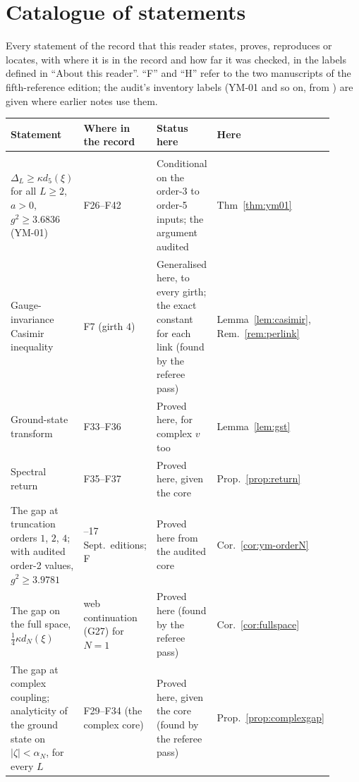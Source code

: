 \section{Catalogue of statements}\label{app:catalogue}

Every statement of the record that this reader states, proves, reproduces or locates, with where it is in the record and how far it was checked, in the labels defined in ``About this reader''. ``F'' and ``H'' refer to the two manuscripts of the fifth-reference edition; the audit's inventory labels (YM-01 and so on, from ) are given where earlier notes use them.

\begin{center}\small
\begin{longtable}{@{}>{\raggedright\arraybackslash}p{0.36\linewidth}>{\raggedright\arraybackslash}p{0.22\linewidth}>{\raggedright\arraybackslash}p{0.22\linewidth}>{\raggedright\arraybackslash}p{0.11\linewidth}@{}}
\toprule
Statement & Where in the record & Status here & Here\\
\midrule
\endhead
\multicolumn{4}{@{}l}{\emph{The strong-coupling gap (fifth reference)}}\\*
$\Delta_L\ge\kappa d_5(\xi)$ for all $L\ge2$, $a>0$, $g^2\ge3.6836$ (YM-01) & F26--F42 & Conditional on the order-3 to order-5 inputs; the argument audited & Thm~\ref{thm:ym01}\\
Gauge-invariance Casimir inequality & F7 (girth $4$) & Generalised here, to every girth; the exact constant for each link (found by the referee pass) & Lemma~\ref{lem:casimir}, Rem.~\ref{rem:perlink}\\
Ground-state transform & F33--F36 & Proved here, for complex $v$ too & Lemma~\ref{lem:gst}\\
Spectral return & F35--F37 & Proved here, given the core & Prop.~\ref{prop:return}\\
The gap at truncation orders $1$, $2$, $4$; with audited order-2 values, $g^2\ge3.9781$ & 14--17 Sept.\ editions; F & Proved here from the audited core & Cor.~\ref{cor:ym-orderN}\\
The gap on the full space, $\frac14\kappa d_N(\xi)$ & web continuation (G27) for $N=1$ & Proved here (found by the referee pass) & Cor.~\ref{cor:fullspace}\\
The gap at complex coupling; analyticity of the ground state on $|\zeta|<\alpha_N$, for every $L$ & F29--F34 (the complex core) & Proved here, given the core (found by the referee pass) & Prop.~\ref{prop:complexgap}\\

\end{longtable}
\end{center}
